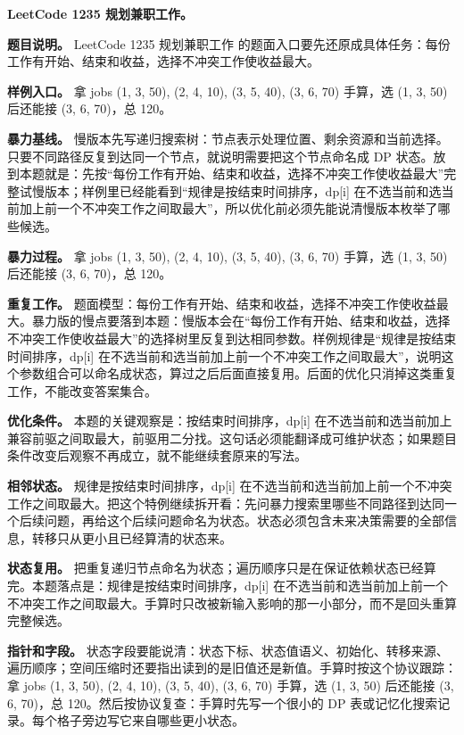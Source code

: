 \noindent\textbf{LeetCode 1235 规划兼职工作。}

\textbf{题目说明。} LeetCode 1235 规划兼职工作 的题面入口要先还原成具体任务：每份工作有开始、结束和收益，选择不冲突工作使收益最大。

\textbf{样例入口。} 拿 jobs (1, 3, 50), (2, 4, 10), (3, 5, 40), (3, 6, 70) 手算，选 (1, 3, 50) 后还能接 (3, 6, 70)，总 120。

\textbf{暴力基线。} 慢版本先写递归搜索树：节点表示处理位置、剩余资源和当前选择。只要不同路径反复到达同一个节点，就说明需要把这个节点命名成 DP 状态。放到本题就是：先按“每份工作有开始、结束和收益，选择不冲突工作使收益最大”完整试慢版本；样例里已经能看到“规律是按结束时间排序，dp[i] 在不选当前和选当前加上前一个不冲突工作之间取最大”，所以优化前必须先能说清慢版本枚举了哪些候选。

\textbf{暴力过程。} 拿 jobs (1, 3, 50), (2, 4, 10), (3, 5, 40), (3, 6, 70) 手算，选 (1, 3, 50) 后还能接 (3, 6, 70)，总 120。

\textbf{重复工作。} 题面模型：每份工作有开始、结束和收益，选择不冲突工作使收益最大。暴力版的慢点要落到本题：慢版本会在“每份工作有开始、结束和收益，选择不冲突工作使收益最大”的选择树里反复到达相同参数。样例规律是“规律是按结束时间排序，dp[i] 在不选当前和选当前加上前一个不冲突工作之间取最大”，说明这个参数组合可以命名成状态，算过之后后面直接复用。后面的优化只消掉这类重复工作，不能改变答案集合。

\textbf{优化条件。} 本题的关键观察是：按结束时间排序，dp[i] 在不选当前和选当前加上兼容前驱之间取最大，前驱用二分找。这句话必须能翻译成可维护状态；如果题目条件改变后观察不再成立，就不能继续套原来的写法。

\textbf{相邻状态。} 规律是按结束时间排序，dp[i] 在不选当前和选当前加上前一个不冲突工作之间取最大。把这个特例继续拆开看：先问暴力搜索里哪些不同路径到达同一个后续问题，再给这个后续问题命名为状态。状态必须包含未来决策需要的全部信息，转移只从更小且已经算清的状态来。

\textbf{状态复用。} 把重复递归节点命名为状态；遍历顺序只是在保证依赖状态已经算完。本题落点是：规律是按结束时间排序，dp[i] 在不选当前和选当前加上前一个不冲突工作之间取最大。手算时只改被新输入影响的那一小部分，而不是回头重算完整候选。

\textbf{指针和字段。} 状态字段要能说清：状态下标、状态值语义、初始化、转移来源、遍历顺序；空间压缩时还要指出读到的是旧值还是新值。手算时按这个协议跟踪：拿 jobs (1, 3, 50), (2, 4, 10), (3, 5, 40), (3, 6, 70) 手算，选 (1, 3, 50) 后还能接 (3, 6, 70)，总 120。然后按协议复查：手算时先写一个很小的 DP 表或记忆化搜索记录。每个格子旁边写它来自哪些更小状态。

